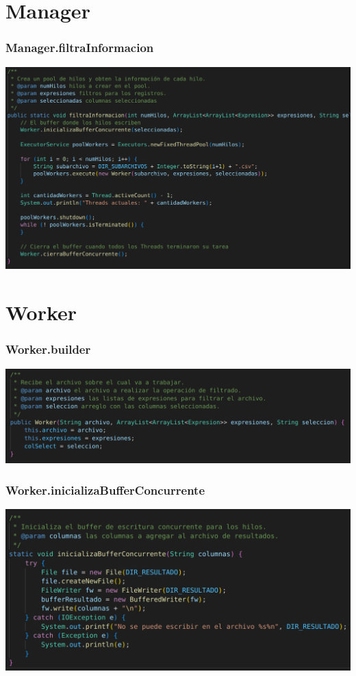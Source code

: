\documentclass{beamer}
\begin{document}
\section{Manager}

\begin{frame}
\frametitle{Manager.filtraInformacion}
\includegraphics[width=\linewidth]{manager}
\end{frame}

\section{Worker}

\begin{frame}
\frametitle{Worker.builder}
\includegraphics[width=\linewidth]{worker_builder}
\end{frame}

\begin{frame}
\frametitle{Worker.inicializaBufferConcurrente}
\includegraphics[width=\linewidth]{worker_inicializabufferconcurrente}
\end{frame}
\end{document}
